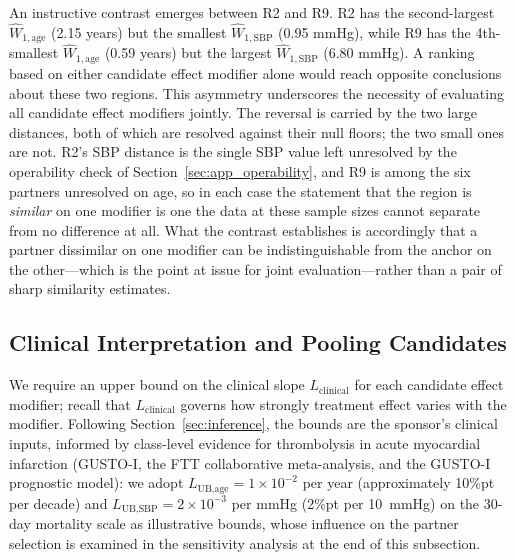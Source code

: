 \documentclass[AMA,Times1COL]{WileyNJDv5}
\begin{document}
An instructive contrast emerges between R2 and R9. R2 has the second-largest $\widehat{W}_{1,\text{age}}$ (2.15 years) but the smallest $\widehat{W}_{1,\text{SBP}}$ (0.95 mmHg), while R9 has the 4th-smallest $\widehat{W}_{1,\text{age}}$ (0.59 years) but the largest $\widehat{W}_{1,\text{SBP}}$ (6.80 mmHg). A ranking based on either candidate effect modifier alone would reach opposite conclusions about these two regions. This asymmetry underscores the necessity of evaluating all candidate effect modifiers jointly. The reversal is carried by the two large distances, both of which are resolved against their null floors; the two small ones are not. R2's SBP distance is the single SBP value left unresolved by the operability check of Section~\ref{sec:app_operability}, and R9 is among the six partners unresolved on age, so in each case the statement that the region is \emph{similar} on one modifier is one the data at these sample sizes cannot separate from no difference at all. What the contrast establishes is accordingly that a partner dissimilar on one modifier can be indistinguishable from the anchor on the other---which is the point at issue for joint evaluation---rather than a pair of sharp similarity estimates.

\subsection{Clinical Interpretation and Pooling Candidates}\label{sec:app_clinical}

We require an upper bound on the clinical slope $L_{\text{clinical}}$ for each candidate effect modifier; recall that $L_{\text{clinical}}$ governs how strongly treatment effect varies with the modifier. Following Section~\ref{sec:inference}, the bounds are the sponsor's clinical inputs, informed by class-level evidence for thrombolysis in acute myocardial infarction (GUSTO-I,\cite{gusto1993} the FTT collaborative meta-analysis,\cite{ftt1994} and the GUSTO-I prognostic model\cite{lee1995}): we adopt $L_{\text{UB,age}} = 1\times10^{-2}$ per year (approximately 10\%pt per decade) and $L_{\text{UB,SBP}} = 2\times10^{-3}$ per mmHg (2\%pt per 10~mmHg) on the 30-day mortality scale as illustrative bounds, whose influence on the partner selection is examined in the sensitivity analysis at the end of this subsection.
\end{document}
